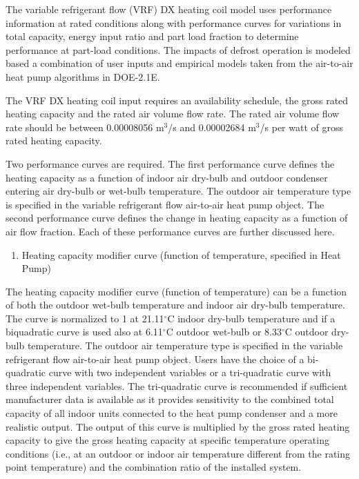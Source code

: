 The variable refrigerant flow (VRF) DX heating coil model uses performance information at rated conditions along with performance curves for variations in total capacity, energy input ratio and part load fraction to determine performance at part-load conditions. The impacts of defrost operation is modeled based a combination of user inputs and empirical models taken from the air-to-air heat pump algorithms in DOE-2.1E.

The VRF DX heating coil input requires an availability schedule, the gross rated heating capacity and the rated air volume flow rate. The rated air volume flow rate should be between 0.00008056 m\(^{3}\)/s and 0.00002684 m\(^{3}\)/s per watt of gross rated heating capacity.

Two performance curves are required. The first performance curve defines the heating capacity as a function of indoor air dry-bulb and outdoor condenser entering air dry-bulb or wet-bulb temperature. The outdoor air temperature type is specified in the variable refrigerant flow air-to-air heat pump object. The second performance curve defines the change in heating capacity as a function of air flow fraction. Each of these performance curves are further discussed here.

\begin{enumerate}
\def\labelenumi{\arabic{enumi})}
\tightlist
\item
  Heating capacity modifier curve (function of temperature, specified in Heat Pump)
\end{enumerate}

The heating capacity modifier curve (function of temperature) can be a function of both the outdoor wet-bulb temperature and indoor air dry-bulb temperature. The curve is normalized to 1 at 21.11$^\circ$C indoor dry-bulb temperature and if a biquadratic curve is used also at 6.11$^\circ$C outdoor wet-bulb or 8.33$^\circ$C outdoor dry-bulb temperature. The outdoor air temperature type is specified in the variable refrigerant flow air-to-air heat pump object. Users have the choice of a bi-quadratic curve with two independent variables or a tri-quadratic curve with three independent variables. The tri-quadratic curve is recommended if sufficient manufacturer data is available as it provides sensitivity to the combined total capacity of all indoor units connected to the heat pump condenser and a more realistic output. The output of this curve is multiplied by the gross rated heating capacity to give the gross heating capacity at specific temperature operating conditions (i.e., at an outdoor or indoor air temperature different from the rating point temperature) and the combination ratio of the installed system.

